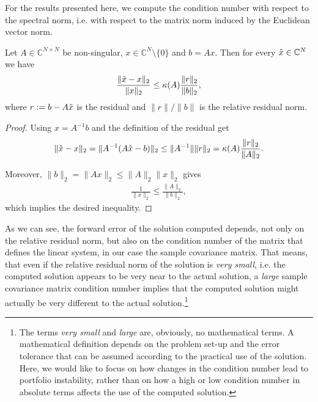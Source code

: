     	For the results presented here, we compute the condition number with respect to the spectral norm, i.e. with respect to the matrix norm induced by the Euclidean vector norm.
    		
    	\begin{theorem}
    		Let $A \in \mathbb{C}^{N \times N}$ be non-singular, $x \in \mathbb{C}^N \setminus \{ 0 \}$ and $b = Ax$. Then for every $\Tilde{x} \in \mathbb{C}^N$ we have
    		\begin{align*}
    			\frac{\| \Tilde{x} - x \|_2}{\| x \|_2} \leq \kappa(A) \frac{\| r \|_2}{\| b \|_2},
    		\end{align*}
    		where $r := b - A \Tilde{x}$ is the residual and $\| r \| / \| b \|$ is the relative residual norm.
    	\end{theorem}
    	
    	\begin{proof}
    		Using $x = A^{-1} b$ and the definition of the residual get
    		\begin{align*}
    			\| \Tilde{x} - x \|_2 = \| A^{-1} (A \Tilde{x} - b)\|_2 \leq \| A^{-1} \| \| r \|_2 = \kappa(A) \frac{\| r \|_2}{\| A \|_2}.
    		\end{align*}
    		
    		Moreover, $\| b \|_2 = \| A x \|_2 \leq \| A \|_2 \| x \|_2$ gives
    		\begin{align*}
    			\frac{1}{\| x \|_2} \leq \frac{\| A \|_2}{\| b \|_2},
    		\end{align*}
    		which implies the desired inequality.
    	\end{proof}
    	
    	As we can see, the forward error of the solution computed depends, not only on the relative residual norm, but also on the condition number of the matrix that defines the linear system, in our case the sample covariance matrix. That means, that even if the relative residual norm of the solution is \textit{very small}, i.e. the computed solution appears to be very near to the actual solution, a \textit{large} sample covariance matrix condition number implies that the computed solution might actually be very different to the actual solution.\footnote{The terms \textit{very small} and \textit{large} are, obviously, no mathematical terms. A mathematical definition depends on the problem set-up and the error tolerance that can be assumed according to the practical use of the solution. Here, we would like to focus on how changes in the condition number lead to portfolio instability, rather than on how a high or low condition number in absolute terms affects the use of the computed solution.}
    	
